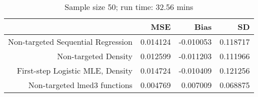 \begin{table}[ht]
\centering
\caption{Sample size 50; run time: 32.56 mins} 
\begin{tabular}{rrrr}
  \hline
 & MSE & Bias & SD \\ 
  \hline
Non-targeted Sequential Regression & 0.014124 & -0.010053 & 0.118717 \\ 
  Non-targeted Density & 0.012599 & -0.011203 & 0.111966 \\ 
  First-step Logistic MLE, Density & 0.014724 & -0.010409 & 0.121256 \\ 
  Non-targeted lmed3 functions & 0.004769 & 0.007009 & 0.068875 \\ 
   \hline
\end{tabular}
\end{table}
